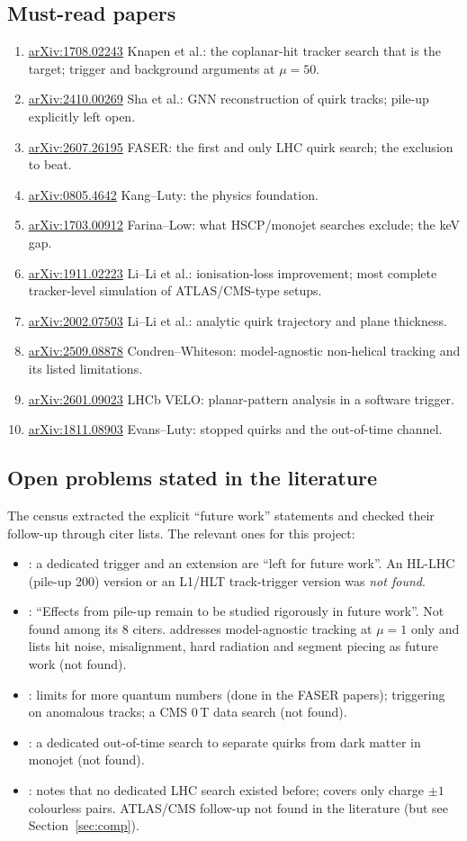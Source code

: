 \documentclass[11pt,a4paper]{article}
\newcommand{\arx}[1]{\href{https://arxiv.org/abs/#1}{arXiv:#1}}
\begin{document}
\subsection{Must-read papers}
\begin{enumerate}[itemsep=0pt]
\item \arx{1708.02243} Knapen et al.: the coplanar-hit tracker search that is the target; trigger and background arguments at $\mu=50$.
\item \arx{2410.00269} Sha et al.: GNN reconstruction of quirk tracks; pile-up explicitly left open.
\item \arx{2607.26195} FASER: the first and only LHC quirk search; the exclusion to beat.
\item \arx{0805.4642} Kang--Luty: the physics foundation.
\item \arx{1703.00912} Farina--Low: what HSCP/monojet searches exclude; the keV gap.
\item \arx{1911.02223} Li--Li et al.: ionisation-loss improvement; most complete tracker-level simulation of ATLAS/CMS-type setups.
\item \arx{2002.07503} Li--Li et al.: analytic quirk trajectory and plane thickness.
\item \arx{2509.08878} Condren--Whiteson: model-agnostic non-helical tracking and its listed limitations.
\item \arx{2601.09023} LHCb VELO: planar-pattern analysis in a software trigger.
\item \arx{1811.08903} Evans--Luty: stopped quirks and the out-of-time channel.
\end{enumerate}

\subsection{Open problems stated in the literature}
The census extracted the explicit ``future work'' statements and checked their follow-up through citer lists. The relevant ones for this project:
\begin{itemize}
\item \cite{Knapen}: a dedicated trigger and an extension are ``left for future work''. An HL-LHC (pile-up 200) version or an L1/HLT track-trigger version was \emph{not found}.
\item \cite{Sha}: ``Effects from pile-up remain to be studied rigorously in future work''. Not found among its 8 citers. \cite{Condren} addresses model-agnostic tracking at $\mu=1$ only and lists hit noise, misalignment, hard radiation and segment piecing as future work (not found).
\item \cite{FarinaLow}: limits for more quantum numbers (done in the FASER papers); triggering on anomalous tracks; a CMS 0\,T data search (not found).
\item \cite{EvansLuty}: a dedicated out-of-time search to separate quirks from dark matter in monojet (not found).
\item \cite{FASER}: notes that no dedicated LHC search existed before; covers only charge $\pm1$ colourless pairs. ATLAS/CMS follow-up not found in the literature (but see Section~\ref{sec:comp}).
\end{itemize}
\end{document}
